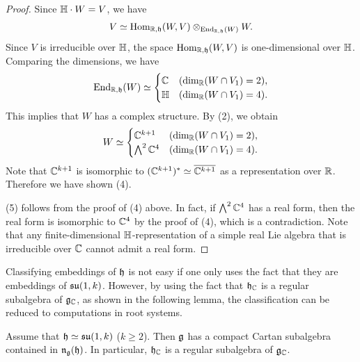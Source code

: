 \begin{proof}
	Since $\mathbb{H}\cdot W = V$, we have
	\begin{align*}
		V \simeq \mathrm{Hom}_{\mathbb{R}, \mathfrak{h}}(W, V) \otimes_{\operatorname{End}_{\mathbb{R}, \mathfrak{h}}(W)} W.
	\end{align*}
	Since $V$ is irreducible over $\mathbb{H}$, the space $\mathrm{Hom}_{\mathbb{R}, \mathfrak{h}}(W, V)$ is one-dimensional over $\mathbb{H}$.
	Comparing the dimensions, we have
	\begin{align*}
		\operatorname{End}_{\mathbb{R}, \mathfrak{h}}(W) \simeq \begin{cases}
			\mathbb{C} & (\dim_{\mathbb{R}}(W \cap V_1) = 2), \\
			\mathbb{H} & (\dim_{\mathbb{R}}(W \cap V_1) = 4).
		\end{cases}
	\end{align*}
	This implies that $W$ has a complex structure.
	By (2), we obtain
	\begin{align*}
		W \simeq \begin{cases}
			\mathbb{C}^{k+1} & (\dim_{\mathbb{R}}(W \cap V_1) = 2), \\
			\bigwedge\nolimits^2 \mathbb{C}^4 & (\dim_{\mathbb{R}}(W \cap V_1) = 4).
		\end{cases}
	\end{align*}
	Note that $\mathbb{C}^{k+1}$ is isomorphic to $(\mathbb{C}^{k+1})^* \simeq \overline{\mathbb{C}^{k+1}}$ as a representation over $\mathbb{R}$.
	Therefore we have shown (4).

	(5) follows from the proof of (4) above.
	In fact, if $\bigwedge\nolimits^2 \mathbb{C}^4$ has a real form, then the real form is isomorphic to $\mathbb{C}^4$ by the proof of (4), which is a contradiction.
	Note that any finite-dimensional $\mathbb{H}$-representation of a simple real Lie algebra that is irreducible over $\mathbb{C}$ cannot admit a real form.
\end{proof}

Classifying embeddings of $\mathfrak{h}$ is not easy if one only uses the fact that they are embeddings of $\mathfrak{su}(1,k)$.
However, by using the fact that $\mathfrak{h}_{\mathbb{C}}$ is a regular subalgebra of $\mathfrak{g}_{\mathbb{C}}$, as shown in the following lemma, the classification can be reduced to computations in root systems.

\begin{lemma} \label{lem:EmbeddingSU}
	Assume that $\mathfrak{h} \simeq \mathfrak{su}(1, k)$ ($k \geq 2$).
	Then $\mathfrak{g}$ has a compact Cartan subalgebra contained in $\mathfrak{n}_{\mathfrak{g}}(\mathfrak{h})$.
	In particular, $\mathfrak{h}_{\mathbb{C}}$ is a regular subalgebra of $\mathfrak{g}_{\mathbb{C}}$.
\end{lemma}

